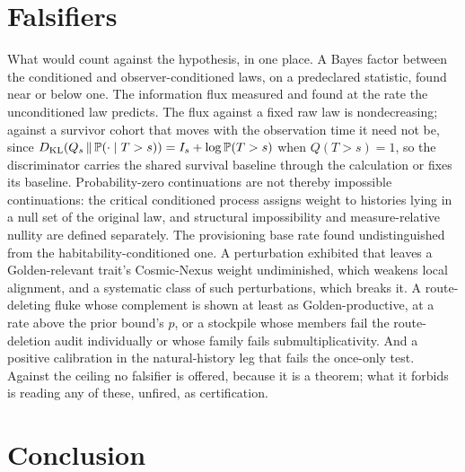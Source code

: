 \section{Falsifiers}\label{sec:falsifiers}

What would count against the hypothesis, in one place. A Bayes factor
between the conditioned and observer-conditioned laws, on a predeclared
statistic, found near or below one. The information flux measured and
found at the rate the unconditioned law predicts. The flux against a fixed raw law is nondecreasing; against a survivor cohort that moves with the observation time it need not be, since $D_{\mathrm{KL}}(Q_s \,\|\, \mathbb{P}(\cdot \mid T > s)) = I_s + \log \mathbb{P}(T > s)$ when $Q(T > s) = 1$, so the discriminator carries the shared survival baseline through the calculation or fixes its baseline. Probability-zero continuations are not thereby impossible continuations: the critical conditioned process assigns weight to histories lying in a null set of the original law, and structural impossibility and measure-relative nullity are defined separately. The provisioning base
rate found undistinguished from the habitability-conditioned one. A
perturbation exhibited that leaves a Golden-relevant trait's Cosmic-Nexus
weight undiminished, which weakens local alignment, and a systematic class
of such perturbations, which breaks it. A route-deleting fluke whose
complement is shown at least as Golden-productive, at a rate above the
prior bound's $p$, or a stockpile whose members fail the route-deletion
audit individually or whose family fails submultiplicativity. And a
positive calibration in the natural-history leg that fails the once-only
test. Against the ceiling no falsifier is offered, because it is a
theorem; what it forbids is reading any of these, unfired, as
certification.

\section{Conclusion}\label{sec:conclusion}

